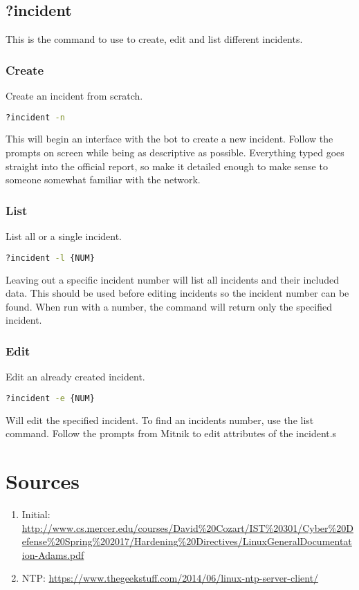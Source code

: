 \documentclass{article}
\begin{document}
\subsection{?incident}
This is the command to use to create, edit and list different incidents.

\subsubsection{Create}
Create an incident from scratch.

\begin{lstlisting}[language=bash]
?incident -n
\end{lstlisting}

This will begin an interface with the bot to create a new incident. Follow the prompts on screen while being as descriptive as possible. Everything typed goes straight into the official report, so make it detailed enough to make sense to someone somewhat familiar with the network. 

\subsubsection{List}
List all or a single incident.

\begin{lstlisting}[language=bash]
?incident -l {NUM}
\end{lstlisting}

Leaving out a specific incident number will list all incidents and their included data. This should be used before editing incidents so the incident number can be found. When run with a number, the command will return only the specified incident.

\subsubsection{Edit}
Edit an already created incident.

\begin{lstlisting}[language=bash]
?incident -e {NUM}
\end{lstlisting}

Will edit the specified incident. To find an incidents number, use the list command. Follow the prompts from Mitnik to edit attributes of the incident.s


\section{Sources}
\begin{enumerate}
    \item Initial: \url{http://www.cs.mercer.edu/courses/David%20Cozart/IST%20301/Cyber%20Defense%20Spring%202017/Hardening%20Directives/LinuxGeneralDocumentation-Adams.pdf} 
   	\item NTP:
   	\url{https://www.thegeekstuff.com/2014/06/linux-ntp-server-client/}
\end{enumerate}
\end{document}
